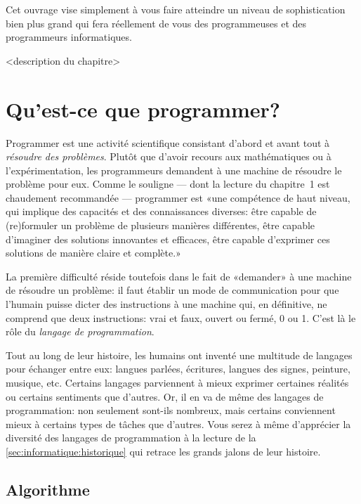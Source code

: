 Cet ouvrage vise simplement à vous faire atteindre un niveau de
sophistication bien plus grand qui fera réellement de vous des
programmeuses et des programmeurs informatiques.

<description du chapitre>

\section{Qu'est-ce que programmer?}
\label{sec:informatique:programmer?}

Programmer est une activité scientifique consistant d'abord et avant
tout à \emph{résoudre des problèmes}. Plutôt que d'avoir recours aux
mathématiques ou à l'expérimentation, les programmeurs demandent à une
machine de résoudre le problème pour eux. Comme le souligne
\citet{Swinnen:python:2012} --- dont la lecture du chapitre~1 est
chaudement recommandée --- programmer est «une compétence de haut
niveau, qui implique des capacités et des connaissances diverses: être
capable de (re)formuler un problème de plusieurs manières différentes,
être capable d’imaginer des solutions innovantes et efficaces, être
capable d’exprimer ces solutions de manière claire et complète.»

La première difficulté réside toutefois dans le fait de «demander» à
une machine de résoudre un problème: il faut établir un mode de
communication pour que l'humain puisse dicter des instructions à une
machine qui, en définitive, ne comprend que deux instructions: vrai et
faux, ouvert ou fermé, 0 ou 1. C'est là le rôle du \emph{langage de
  programmation}.

Tout au long de leur histoire, les humains ont inventé une multitude
de langages pour échanger entre eux: langues parlées, écritures,
langues des signes, peinture, musique, etc. Certains langages
parviennent à mieux exprimer certaines réalités ou certains sentiments
que d'autres. Or, il en va de même des langages de programmation: non
seulement sont-ils nombreux, mais certains conviennent mieux à
certains types de tâches que d'autres. Vous serez à même d'apprécier
la diversité des langages de programmation à la lecture de la
\autoref{sec:informatique:historique} qui retrace les grands jalons de
leur histoire.

\subsection{Algorithme}
\label{sec:informatique:programmer:algorithme}

